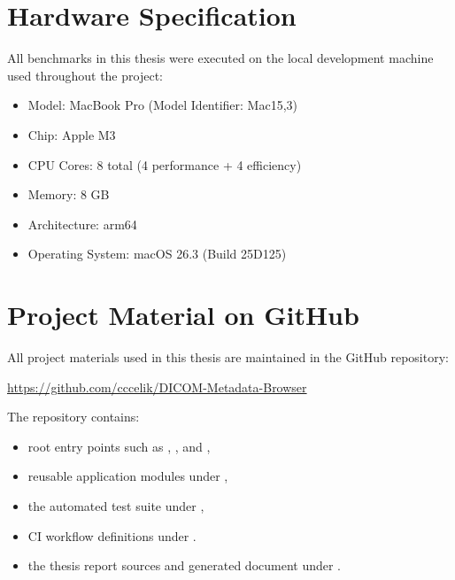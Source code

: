 \section{Hardware Specification}
All benchmarks in this thesis were executed on the local development machine used throughout the project:
\begin{itemize}
\item Model: MacBook Pro (Model Identifier: Mac15,3)
\item Chip: Apple M3
\item CPU Cores: 8 total (4 performance + 4 efficiency)
\item Memory: 8 GB
\item Architecture: arm64
\item Operating System: macOS 26.3 (Build 25D125)
\end{itemize}

\section{Project Material on GitHub}
All project materials used in this thesis are maintained in the GitHub repository:
\begin{center}
\url{https://github.com/cccelik/DICOM-Metadata-Browser}
\end{center}

The repository contains:
\begin{itemize}
\item root entry points such as , , and ,
\item reusable application modules under ,
\item the automated test suite under ,
\item CI workflow definitions under .
\item the thesis report sources and generated document under .
\end{itemize}
